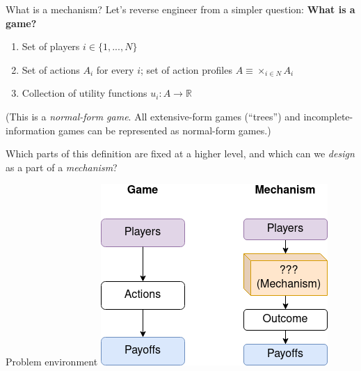 \documentclass[english,10pt
,aspectratio=169
]{beamer}
\begin{document}

\begin{frame}{What is a mechanism?}
	Let's reverse engineer from a simpler question:
	\textbf{What is a game?}
	\begin{enumerate}
		\item Set of players $i \in\{ 1,...,N\}$
		\item Set of actions $A_i$ for every $i$; set of action profiles $A \equiv \times_{i \in N} A_i$
		\item Collection of utility functions $u_i: A \to \mathbb{R}$
	\end{enumerate}
	(This is a \emph{normal-form game}. All extensive-form games (``trees'') and incomplete-information games can be represented as normal-form games.)
	
	Which parts of this definition are fixed at a higher level, and which can we \emph{design} as a part of a \emph{mechanism}?
\end{frame}


\begin{frame}{Problem environment}
	\centering
	\includegraphics[scale=0.7]{pics/M1/game_vs_mech}
\end{frame}
\end{document}
